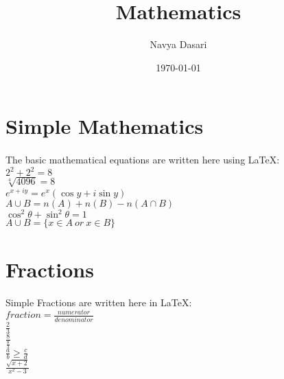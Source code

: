 \documentclass[12pt]{article}
\title{Mathematics}
\author{Navya Dasari}
\date{\today}
\begin{document}
	\maketitle
	
	\section{Simple Mathematics}
	
	\paragraph{}
	
	The basic mathematical equations are written here using LaTeX: \\
	
	$2^2 + 2^2 = 8$ \\
	
	$\sqrt[4]{4096} = 8$ \\
	
	$e^{x+iy} = e^x(\cos y + i\sin y)$ \\
	
	$A \cup B = n(A) + n(B) - n(A \cap B)$ \\
	
	$\cos^2\theta + \sin^2\theta = 1$  \\
	
	$A \cup B = \{x \in A \ {or} \ x \in B\}$
	
	\section{Fractions}
	
	\paragraph{}
	
	Simple Fractions are written here in LaTeX: \\
	
	$fraction = \frac{numerator}{denominator}$  \\
	
	$\frac{2}{3}$  \\
	
	$\frac{8}{\frac{8}{3}}$ \\
	
	$\frac{a}{b} \geq \frac{c}{d}$  \\
	
	$\frac{\sqrt{x + 2}}{x^2 - 3}$  \\
	
\end{document}
